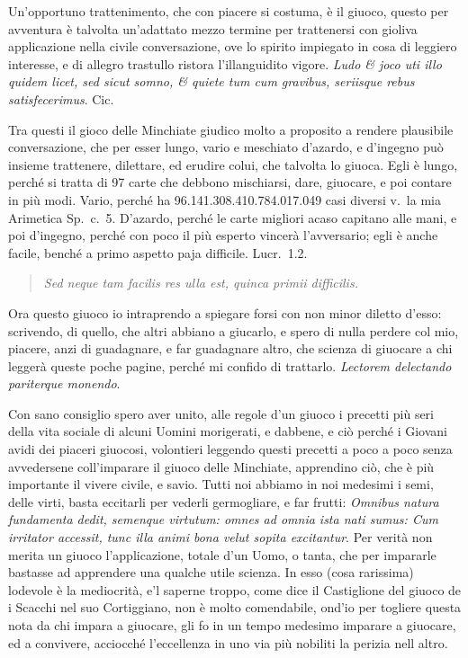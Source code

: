 \documentclass[11pt,a6paper]{article}
\newcommand{\literaryquote}[1]{%
\kern -6pt  \begin{verse}
    {\footnotesize \it #1}
  \end{verse}\kern -2pt%
}
\begin{document}
Un'opportuno trattenimento, che con
piacere si costuma, è il giuoco, questo per
avventura è talvolta un'adattato mezzo
termine per trattenersi con gioliva applicazione
nella civile conversazione, ove lo spirito
impiegato in cosa di leggiero interesse, e di
allegro trastullo ristora l'illanguidito vigore.
\textit{Ludo \& joco uti illo quidem licet, sed sicut
 somno, \& quiete tum cum gravibus, seriisque
 rebus satisfecerimus}. Cic.

Tra questi il gioco delle Minchiate giudico
molto a proposito a rendere plausibile
conversazione, che per esser lungo, vario
e meschiato d'azardo, e d'ingegno può insieme
trattenere, dilettare, ed erudire colui,
che talvolta lo giuoca. Egli è lungo,
perché si tratta di 97 carte che debbono mischiarsi,
dare, giuocare, e poi contare in più
modi. Vario, perché ha 96.141.308.410.784.017.049
casi diversi v.\ la mia Arimetica
Sp.\ c.\ 5. D'azardo, perché le carte migliori
acaso capitano alle mani, e poi d'ingegno,
perché con poco il più esperto vincerà l'avversario;
egli è anche facile, benché a primo
aspetto paja difficile. Lucr.\ 1.2.
\literaryquote{
 Sed neque tam facilis res ulla est, quinca primii difficilis.}

Ora questo giuoco io intraprendo a spiegare
forsi con non minor diletto d'esso: scrivendo,
di quello, che altri abbiano a giucarlo,
e spero di nulla perdere col mio, piacere,
anzi di guadagnare, e far guadagnare
altro, che scienza di giuocare a chi leggerà
queste poche pagine, perché mi confido di
trattarlo. \textit{Lectorem delectando pariterque
 monendo}.

Con sano consiglio spero aver unito, alle
regole d'un giuoco i precetti più seri della
vita sociale di alcuni Uomini morigerati, e
dabbene, e ciò perché i Giovani avidi dei
piaceri giuocosi, volontieri leggendo questi
precetti a poco a poco senza avvedersene
coll'imparare il giuoco delle Minchiate,
apprendino ciò, che è più importante il vivere
civile, e savio. Tutti noi abbiamo in noi
medesimi i semi, delle virti, basta eccitarli
per vederli germogliare, e far frutti: \textit{
 Omnibus natura fundamenta dedit, semenque
virtutum: omnes ad omnia ista nati sumus:
Cum irritator accessit, tunc illa animi bona
velut sopita excitantur}. Per verità non
merita un giuoco l'applicazione, totale d'un
Uomo, o tanta, che per impararle bastasse ad
apprendere una qualche utile scienza. In esso
(cosa rarissima) lodevole è la mediocrità,
e'l saperne troppo, come dice il Castiglione
del giuoco de i Scacchi nel suo Cortiggiano,
non è molto comendabile, ond'io per togliere
questa nota da chi impara a giuocare, gli fo
in un tempo medesimo imparare a giuocare,
ed a convivere, acciocché l'eccellenza in uno
via più nobiliti la perizia nell altro.
\end{document}
